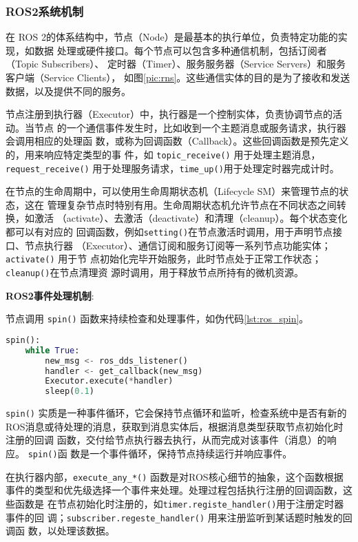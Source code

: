 \subsubsection{ROS2系统机制}
在 ROS 2的体系结构中，节点（Node）是最基本的执行单位，负责特定功能的实现，如数据
处理或硬件接口。每个节点可以包含多种通信机制，包括订阅者（Topic Subscribers）、
定时器（Timer）、服务服务器（Service Servers）和服务客户端（Service Clients），
如图\ref{pic:rns}。这些通信实体的目的是为了接收和发送数据，以及提供不同的服务。

节点注册到执行器（Executor）中，执行器是一个控制实体，负责协调节点的活动。当节点
的一个通信事件发生时，比如收到一个主题消息或服务请求，执行器会调用相应的处理函
数，或称为回调函数（Callback）。这些回调函数是预先定义的，用来响应特定类型的事
件，如 \texttt{topic\_receive()} 用于处理主题消息， \texttt{request\_receive()}
用于处理服务请求，\texttt{time\_up()}用于处理定时器完成计时。

在节点的生命周期中，可以使用生命周期状态机（Lifecycle SM）来管理节点的状态，这在
管理复杂节点时特别有用。生命周期状态机允许节点在不同状态之间转换，如激活
（activate）、去激活（deactivate）和清理（cleanup）。每个状态变化都可以有对应的
回调函数，例如\texttt{setting()}在节点激活时调用，用于声明节点接口、节点执行器
（Executor）、通信订阅和服务订阅等一系列节点功能实体；\texttt{activate()} 用于节
点初始化完毕开始服务，此时节点处于正常工作状态； \texttt{cleanup()}在节点清理资
源时调用，用于释放节点所持有的微机资源。

\textbf{ROS2事件处理机制}: 

节点调用 \texttt{spin()} 函数来持续检查和处理事件，如伪代码\ref{lst:ros_spin}。

\begin{lstlisting}[language=Python, caption=ROS2事件循环示例, label=lst:ros_spin]
spin():
    while True:
        new_msg <- ros_dds_listener()
        handler <- get_callback(new_msg)
        Executor.execute(*handler)
        sleep(0.1)
\end{lstlisting}

\texttt{spin()} 实质是一种事件循环，它会保持节点循环和监听，检查系统中是否有新的
ROS消息或待处理的消息，获取到消息实体后，根据消息类型获取节点初始化时注册的回调
函数，交付给节点执行器去执行，从而完成对该事件（消息）的响应。 \texttt{spin()}函
数是一个事件循环，保持节点持续运行并响应事件。

在执行器内部，\texttt{execute\_any\_*()} 函数是对ROS核心细节的抽象，这个函数根据
事件的类型和优先级选择一个事件来处理。处理过程包括执行注册的回调函数，这些函数是
在节点初始化时注册的，如\texttt{timer.registe\_handler()}用于注册定时器事件的回
调；\texttt{subscriber.regeste\_handler()} 用来注册监听到某话题时触发的回调函
数，以处理该数据。

